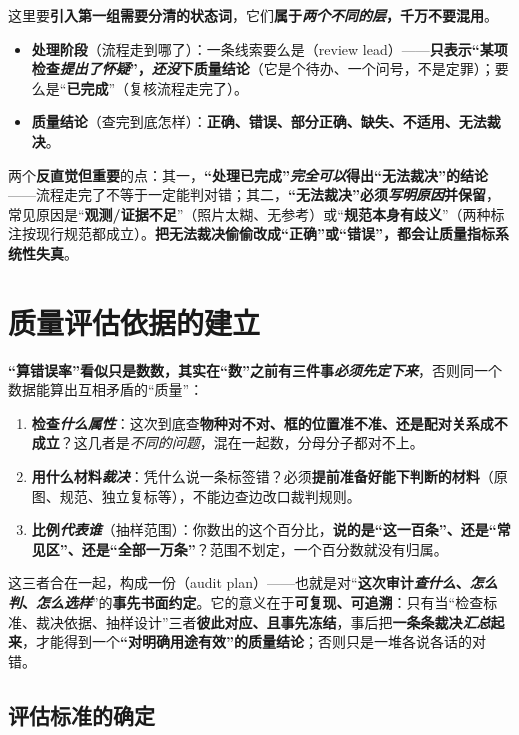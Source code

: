 这里要\textbf{引入第一组需要分清的状态词}，它们\textbf{属于\emph{两个不同的层}，千万不要混用}。
\begin{itemize}\item \textbf{处理阶段}（流程走到哪了）：一条线索要么是（review lead）——\textbf{只表示“某项检查\emph{提出了怀疑}”，\emph{还没}下质量结论}（它是个待办、一个问号，不是定罪）；要么是“\textbf{已完成}”（复核流程走完了）。\item \textbf{质量结论}（查完到底怎样）：\textbf{正确、错误、部分正确、缺失、不适用、无法裁决}。\end{itemize}
两个\textbf{反直觉但重要}的点：其一，\textbf{“处理已完成”\emph{完全可以}得出“无法裁决”的结论}——流程走完了不等于一定能判对错；其二，\textbf{“无法裁决”必须\emph{写明原因}并保留}，常见原因是“\textbf{观测/证据不足}”（照片太糊、无参考）或“\textbf{规范本身有歧义}”（两种标注按现行规范都成立）。\textbf{把无法裁决偷偷改成“正确”或“错误”，都会让质量指标系统性失真}。

\section{质量评估依据的建立}
\label{sec:knowledge-quality-assessment-correction-basis}

\textbf{“算错误率”看似只是数数，其实在“数”之前有三件事\emph{必须先定下来}}，否则同一个数据能算出互相矛盾的“质量”：
\begin{enumerate}\item \textbf{检查\emph{什么属性}}：这次到底查\textbf{物种对不对、框的位置准不准、还是配对关系成不成立}？这几者是\emph{不同的问题}，混在一起数，分母分子都对不上。\item \textbf{用什么材料\emph{裁决}}：凭什么说一条标签错？必须\textbf{提前准备好能下判断的材料}（原图、规范、独立复标等），不能边查边改口裁判规则。\item \textbf{比例\emph{代表谁}}（抽样范围）：你数出的这个百分比，\textbf{说的是“这一百条”、还是“常见区”、还是“全部一万条”}？范围不划定，一个百分数就没有归属。\end{enumerate}
这三者合在一起，构成一份（audit plan）——也就是对“\textbf{这次审计\emph{查什么}、\emph{怎么判}、\emph{怎么选样}}”的\textbf{事先书面约定}。它的意义在于\textbf{可复现、可追溯}：只有当“检查标准、裁决依据、抽样设计”三者\textbf{彼此对应、且事先冻结}，事后把\textbf{一条条裁决\emph{汇总}起来}，才能得到一个\textbf{“对明确用途有效”的质量结论}；否则只是一堆各说各话的对错。

\subsection{评估标准的确定}
\label{sec:knowledge-quality-assessment-correction-criteria}

